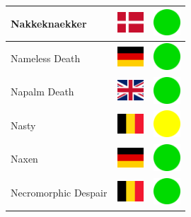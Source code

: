 \documentclass[12pt, a4paper, twoside]{report}
\begin{document}
\begin{center}
\begin{longtable}{|p{5cm}|p{2cm}|p{2cm}|}
 Nakkeknaekker                                              & \includegraphics[width=1cm]{../4x3/dk} &   \includegraphics[width=1cm]{../likes/y} \\ \hline
 Nameless Death                                             & \includegraphics[width=1cm]{../4x3/de} &   \includegraphics[width=1cm]{../likes/y} \\ \hline
 Napalm Death                                               & \includegraphics[width=1cm]{../4x3/gb} &   \includegraphics[width=1cm]{../likes/y} \\ \hline
 Nasty                                                      & \includegraphics[width=1cm]{../4x3/be} &   \includegraphics[width=1cm]{../likes/m} \\ \hline
 Naxen                                                      & \includegraphics[width=1cm]{../4x3/de} &   \includegraphics[width=1cm]{../likes/y} \\ \hline
 Necromorphic Despair                                       & \includegraphics[width=1cm]{../4x3/be} &   \includegraphics[width=1cm]{../likes/y} \\ \hline

\end{longtable}
\end{center}
\end{document}

